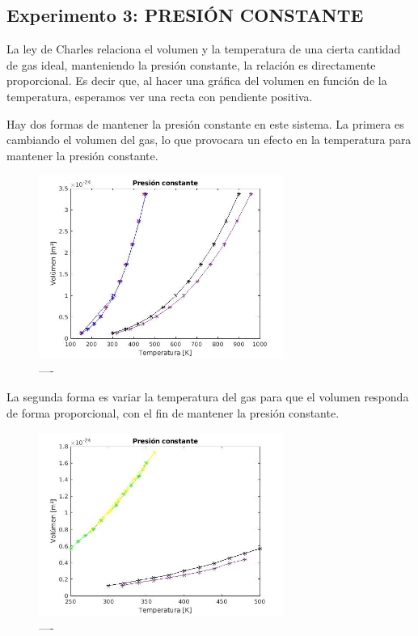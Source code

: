 \documentclass[journal,transmag]{IEEEtran}
\begin{document}
\subsection{Experimento 3: PRESIÓN CONSTANTE }

La ley de Charles relaciona el volumen y la temperatura de una cierta cantidad de gas ideal, manteniendo la presión constante, la relación es directamente proporcional. Es decir que, al hacer una gráfica del volumen en función de la temperatura, esperamos ver una recta con pendiente positiva. 

Hay dos formas de mantener la presión constante en este sistema. La primera es cambiando el volumen del gas, lo que provocara un efecto en la temperatura para mantener la presión constante. 

\begin{figure}[!h]
				\center
				\includegraphics[width=8cm]{img/precte1.jpg}
				\caption{----}
				\label{f15}
	\end{figure}
	
	La segunda forma es variar la temperatura del gas para que el volumen responda de forma proporcional, con el fin de mantener la presión constante.  
\begin{figure}[!h]
				\center
				\includegraphics[width=8cm]{img/precte2.jpg}
				\caption{----}
				\label{f16}
	\end{figure}
\end{document}
